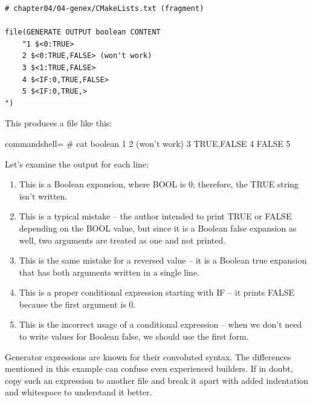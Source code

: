 \begin{lstlisting}[style=styleCMake]
# chapter04/04-genex/CMakeLists.txt (fragment)

file(GENERATE OUTPUT boolean CONTENT
	"1 $<0:TRUE>
	2 $<0:TRUE,FALSE> (won't work)
	3 $<1:TRUE,FALSE>
	4 $<IF:0,TRUE,FALSE>
	5 $<IF:0,TRUE,>
")
\end{lstlisting}

This produces a file like this:

\begin{tcblisting}{commandshell={}}
# cat boolean
1
  2 (won't work)
  3 TRUE,FALSE 
  4 FALSE
  5
\end{tcblisting}

Let's examine the output for each line:

\begin{enumerate}
\item 
This is a Boolean expansion, where BOOL is 0; therefore, the TRUE string isn't written.

\item 
This is a typical mistake – the author intended to print TRUE or FALSE depending on the BOOL value, but since it is a Boolean false expansion as well, two arguments are treated as one and not printed.

\item 
This is the same mistake for a reversed value – it is a Boolean true expansion that has both arguments written in a single line.

\item 
This is a proper conditional expression starting with IF – it prints FALSE because the first argument is 0.

\item 
This is the incorrect usage of a conditional expression – when we don't need to write values for Boolean false, we should use the first form.
\end{enumerate}

Generator expressions are known for their convoluted syntax. The differences mentioned in this example can confuse even experienced builders. If in doubt, copy such an expression to another file and break it apart with added indentation and whitespace to understand it better.











